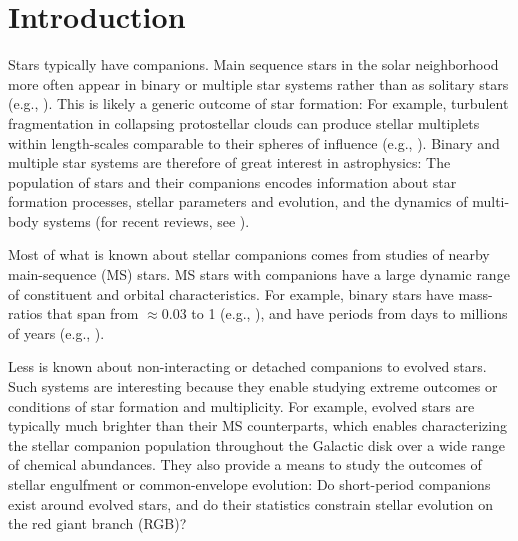 \documentclass[modern, letterpaper]{aastex62}
\begin{document}

\section{Introduction} \label{sec:intro}

Stars typically have companions.
Main sequence stars in the solar neighborhood more often appear in binary or
multiple star systems rather than as solitary stars (e.g.,
\citealt{Duquennoy:1991,Raghavan:2010,Tokovinin:2014}).
This is likely a generic outcome of star formation: For example, turbulent
fragmentation in collapsing protostellar clouds can produce stellar multiplets
within length-scales comparable to their spheres of influence (e.g.,
\citealt{Raskutti:2016}).
Binary and multiple star systems are therefore of great interest in
astrophysics: The population of stars and their companions encodes information
about star formation processes, stellar parameters and evolution, and the
dynamics of multi-body systems (for recent reviews, see
\citealt{Duchene:2013,Moe:2017}).

Most of what is known about stellar companions comes from studies of
nearby main-sequence (MS) stars.
MS stars with companions have a large dynamic range of constituent and orbital
characteristics.
For example, binary stars have mass-ratios that span from $\approx 0.03$
to 1 (e.g., \citealt{Kraus:2008}), and have periods from days to
millions of years (e.g., \citealt{Raghavan:2010}).

Less is known about non-interacting or detached companions to evolved stars.
Such systems are interesting because they enable studying extreme outcomes or
conditions of star formation and multiplicity.
For example, evolved stars are typically much brighter than their MS
counterparts, which enables characterizing the stellar companion population
throughout the Galactic disk over a wide range of chemical abundances.
They also provide a means to study the outcomes of stellar engulfment or
common-envelope evolution: Do short-period companions exist around evolved
stars, and do their statistics constrain stellar evolution on the red giant
branch (RGB)?
\end{document}
